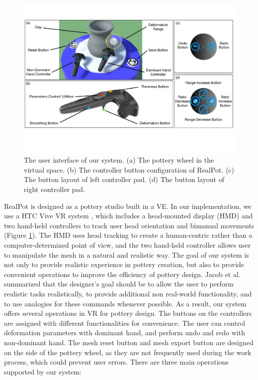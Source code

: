 \documentclass{svjour3}                     %
\begin{document}
\begin{figure}
\includegraphics[width=\textwidth]{fig9}
\caption{The user interface of our system. (a) The pottery wheel in the virtual space. (b) The controller button configuration of RealPot. (c) The button layout of left controller pad. (d) The button layout of right controller pad.}
\label{fig:ui}
\end{figure}

RealPot is designed as a pottery studio built in a VE.
In our implementation, we use a HTC Vive VR system \cite{website:vive}, which includes a head-mounted display (HMD) and two hand-held controllers to track user head orientation and bimanual movements (Figure \ref{fig:ui}).
The HMD uses head tracking to create a human-centric rather than a computer-determined point of view, and the two hand-held controller allows user to manipulate the mesh in a natural and realistic way.
The goal of our system is not only to provide realistic experience in pottery creation, but also to provide convenient operations to improve the efficiency of pottery design. 
Jacob et al. \cite{Jacob2008Reality} summarized that the designer's goal should be to allow the user to perform realistic tasks realistically, to provide additional non real-world functionality, and to use analogies for these commands whenever possible.
As a result, our system offers several operations in VR for pottery design.
The buttons on the controllers are assigned with different functionalities for convenience. The user can control deformation parameters with dominant hand, and perform undo and redo with non-dominant hand.
The mesh reset button and mesh export button are designed on the side of the pottery wheel, as they are not frequently used during the work process, which could prevent user errors.
There are three main operations supported by our system:
\end{document}
